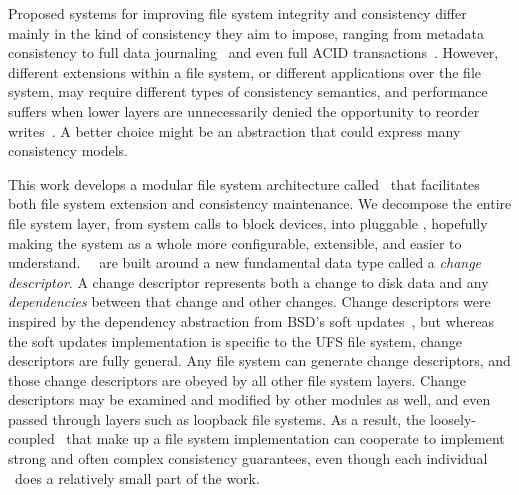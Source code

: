 Proposed systems for improving file system integrity and consistency differ
 mainly in the kind of consistency they aim to impose, ranging from
 metadata consistency to full data journaling~\cite{tweedie98journaling} and even full ACID
 transactions~\cite{gal05transactional,liskov04transactional}.
%
However, different extensions within a file system, or different
 applications over the file system, may require different types of
 consistency semantics, and performance suffers when lower layers are
 unnecessarily denied the opportunity to reorder
 writes~\cite{ganger00soft}.
%
A better choice might be an abstraction that could express many consistency
 models.



This work develops a modular file system architecture called \Kudos\ that
 facilitates both file system extension and consistency
 maintenance.
%
We decompose the entire file system layer, from system calls to block
 devices, into pluggable \modules, hopefully making the system as a whole
 more configurable, extensible, and easier to understand.
%
\Kudos\ \modules\ are built around a new fundamental data type called a
 \emph{change descriptor}.
%
A change descriptor represents both a change to disk data and any
 \emph{dependencies} between that change and other changes.
%
Change descriptors were inspired by the dependency abstraction from BSD's
 soft updates~\cite{ganger00soft}, but whereas the soft updates implementation
 is specific to the UFS file system, change descriptors are fully general.
%
Any file system can generate change descriptors, and those change
 descriptors are obeyed by all other file system layers.
%
Change descriptors may be examined and modified by other modules
 as well, and even passed through layers such as loopback file systems.
%
As a result, the loosely-coupled \modules\ that make up a file system
 implementation can cooperate to implement strong and often complex
 consistency guarantees, even though each individual \module\ does a
 relatively small part of the work.



